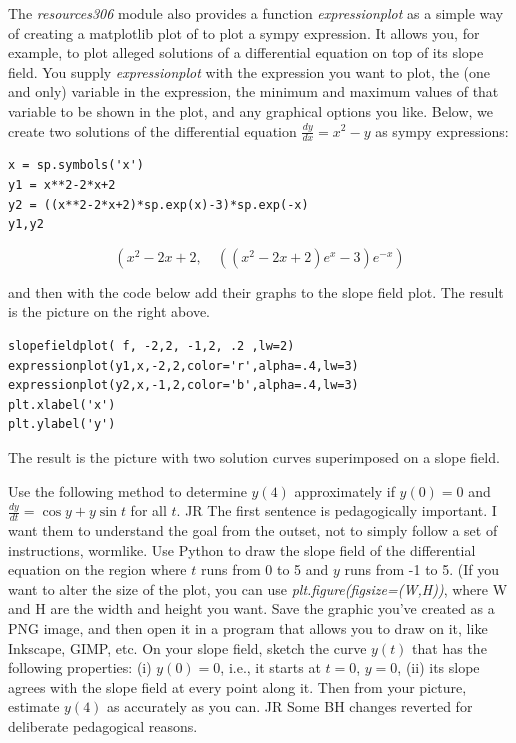 \documentclass[12pt]{book}
\begin{document}
\noindent The \emph{resources306} module also provides a function \emph{expressionplot} as a simple way 
{\color{red}of creating a matplotlib plot of} 
{\color{blue}to plot} a sympy expression. 
{\color{red}It allows you, for example, to plot alleged solutions of a differential 
equation on top of its slope field.} 
You supply \emph{expressionplot} with the expression you want to plot, 
the (one and only) variable in the expression,
the minimum and maximum values of that variable to be shown in the plot, 
and any graphical options you like.
Below, we create two solutions of the differential equation $\frac{dy}{dx} = x^2 - y$ as sympy expressions:


\begin{small}
\begin{verbatim}
x = sp.symbols('x')
y1 = x**2-2*x+2
y2 = ((x**2-2*x+2)*sp.exp(x)-3)*sp.exp(-x)
y1,y2
\end{verbatim}
\end{small}
$$\left ( x^{2} - 2 x + 2, \quad \left(\left(x^{2} - 2 x + 2\right) e^{x} - 3\right) e^{- x}\right )$$

\noindent and then with the code below add their graphs to the slope field plot.
{\color{red}The result is the picture on the right above.}

\begin{small}
\begin{verbatim}
slopefieldplot( f, -2,2, -1,2, .2 ,lw=2)
expressionplot(y1,x,-2,2,color='r',alpha=.4,lw=3)
expressionplot(y2,x,-1,2,color='b',alpha=.4,lw=3)
plt.xlabel('x')
plt.ylabel('y')
\end{verbatim}
\end{small}
{\color{red}The result is the picture with two solution curves superimposed on a slope field.}


\begin{exercise}
Use the following method to determine $y(4)$ approximately if $y(0)=0$ and $\frac{dy}{dt} = \cos y + y \sin t$ for all $t$. {\color{green}JR The first sentence is pedagogically important. I want them to understand the goal from the outset, not to simply follow a set of instructions, wormlike.}
Use Python to draw the slope field of the differential equation on the region where $t$ runs from 0 to 5 and $y$ runs from -1 to 5. 
{\color{red}
(If you want to alter the size of the plot, you can use \emph{plt.figure(figsize=(W,H))}, where W and H are the width and height you want. }
Save the graphic you've created as a PNG image, and then open it in a program that
allows you to draw on it, like Inkscape, GIMP, etc.
On your slope field, sketch the curve $y(t)$ that has the following properties: (i) {\color{blue}$y(0)=0$,
i.e., it starts at $t=0$, $y=0$, (ii) its slope agrees with the slope field at every point along it.}
Then from your picture, estimate $y(4)$ as accurately as you can. {\color{green} JR Some BH changes reverted
for deliberate pedagogical reasons.}
\end{exercise}
\end{document}
